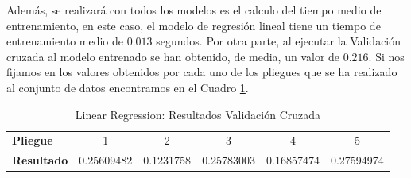 Además, se realizará con todos los modelos es el calculo del tiempo medio de entrenamiento, en este caso, el modelo de regresión lineal tiene un tiempo de entrenamiento medio de $0.013$ segundos. Por otra parte, al ejecutar la Validación cruzada al modelo entrenado se han obtenido, de media, un valor de $0.216$. Si nos fijamos en los valores obtenidos por cada uno de los pliegues que se ha realizado al conjunto de datos encontramos en el Cuadro \ref{Modelos-Lineales-Linear-Regression-Validacion-Cruzada}.

\begin{table}[h]
    \centering
    \begin{tabular}{lccccc}
        \textbf{Pliegue} & 1 & 2 & 3 & 4 & 5 \\
        \textbf{Resultado} & 0.25609482 & 0.1231758 & 0.25783003 & 0.16857474 & 0.27594974
    \end{tabular}
    \caption{Linear Regression: Resultados Validación Cruzada}
    \label{Modelos-Lineales-Linear-Regression-Validacion-Cruzada}
\end{table}
